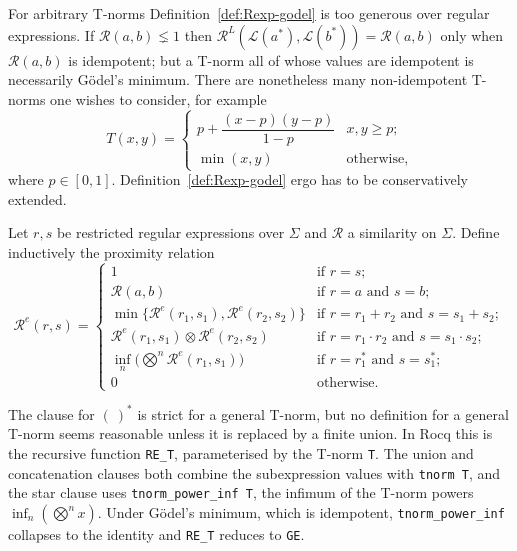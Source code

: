 For arbitrary T-norms Definition~\ref{def:Rexp-godel} is too generous over regular
expressions. If $\mathcal{R}(a,b)\lneq 1$ then
$\mathcal{R}^{L}(\mathcal{L}(a^{*}),\mathcal{L}(b^{*}))=\mathcal{R}(a,b)$ only when
$\mathcal{R}(a,b)$ is idempotent; but a T-norm all of whose values are idempotent is
necessarily Gödel's minimum. There are nonetheless many non-idempotent T-norms one
wishes to consider, for example
\[
T(x,y)=
\begin{cases}
p+\dfrac{(x-p)(y-p)}{1-p} & x,y\ge p;\\[1.0ex]
\min(x,y) & \text{otherwise,}
\end{cases}
\]
where $p\in[0,1]$. Definition~\ref{def:Rexp-godel} ergo has to be
conservatively extended.

\begin{definition}\label{def:Re}
Let $r,s$ be restricted regular expressions over $\Sigma$ and $\mathcal{R}$ a
similarity on $\Sigma$. Define inductively the proximity relation
\[
\mathcal{R}^{e}(r,s)=
\begin{cases}
1 & \text{if } r=s;\\[0.3ex]
\mathcal{R}(a,b) & \text{if } r=a \text{ and } s=b;\\[0.3ex]
\min\{\mathcal{R}^{e}(r_1,s_1),\mathcal{R}^{e}(r_2,s_2)\}
  & \text{if } r=r_1+r_2 \text{ and } s=s_1+s_2;\\[0.3ex]
\mathcal{R}^{e}(r_1,s_1)\otimes\mathcal{R}^{e}(r_2,s_2)
  & \text{if } r=r_1\cdot r_2 \text{ and } s=s_1\cdot s_2;\\[0.3ex]
\inf_n\bigl(\textstyle\bigotimes^{n}\mathcal{R}^{e}(r_1,s_1)\bigr)
  & \text{if } r=r_1^{*} \text{ and } s=s_1^{*};\\[0.3ex]
0 & \text{otherwise.}
\end{cases}
\]
\end{definition}

The clause for $(\ )^{*}$ is strict for a general T-norm, but no definition
for a general T-norm seems reasonable unless it is replaced by a finite union. In
Rocq this is the recursive function \texttt{RE\_T}, parameterised by the T-norm
\texttt{T}. The union and concatenation clauses both combine the subexpression
values with \texttt{tnorm T}, and the star clause uses \texttt{tnorm\_power\_inf T},
the infimum of the T-norm powers $\inf_n(\bigotimes^{n}x)$. Under Gödel's minimum,
which is idempotent, \texttt{tnorm\_power\_inf} collapses to the identity and
\texttt{RE\_T} reduces to \texttt{GE}.

